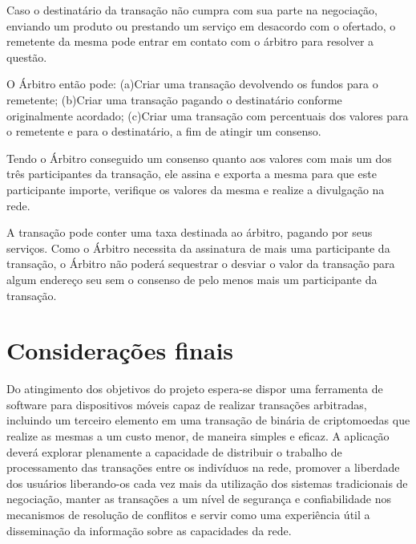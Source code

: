 \documentclass[
	article,			%
	11pt,				%
	oneside,			%
	a4paper,			%
	chapter=TITLE,		%
	section=TITLE,		%
	subsection=TITLE,	%
	subsubsection=TITLE, %
	english,			%
	brazil,				%
	sumario=tradicional
	]{ifrs-artigo-abntex2}
\begin{document}

Caso o destinatário da transação não cumpra com sua parte na negociação, enviando um produto ou prestando um serviço em desacordo com o ofertado, o remetente da mesma pode entrar em contato com o árbitro para resolver a questão.

O Árbitro então pode: (a)Criar uma transação devolvendo os fundos para o remetente;
(b)Criar uma transação pagando o destinatário conforme originalmente acordado; (c)Criar uma transação com percentuais dos valores para o remetente e para o destinatário, a fim de atingir um consenso. 

Tendo o Árbitro conseguido um consenso quanto aos valores com mais um dos três participantes da transação, ele assina e exporta a mesma para que este participante importe, verifique os valores da mesma e realize a divulgação na rede.

A transação pode conter uma taxa destinada ao árbitro, pagando por seus serviços. Como o Árbitro necessita da assinatura de mais uma participante da transação, o Árbitro não poderá sequestrar o desviar o valor da transação para algum endereço seu sem o consenso de pelo menos mais um participante da transação.



% 

\section{Considerações finais}
Do atingimento dos objetivos do projeto espera-se dispor uma ferramenta de software para dispositivos móveis capaz de realizar transações arbitradas, incluindo um terceiro elemento em uma transação de binária de criptomoedas que realize as mesmas a um custo menor, de maneira simples e eficaz. A aplicação deverá explorar plenamente a capacidade de distribuir o trabalho de processamento das transações entre os indivíduos na rede, promover a liberdade dos usuários liberando-os cada vez mais da utilização dos sistemas tradicionais de negociação, manter as transações  a um nível de segurança e confiabilidade nos mecanismos de resolução de conflitos e servir como uma experiência útil a disseminação da informação sobre as capacidades da rede.

\postextual
\end{document}
